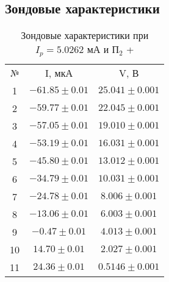 \documentclass[a4paper]{article}
\begin{document}
\subsection{Зондовые характеристики}
       \begin{table}[h]
    \centering
        \begin{tabular}{|c|c|c|}
        \cline{1-3}
        № & I, мкА& V, В\\ \cline{1-3}
        1 & $-61.85\pm 0.01$& $25.041 \pm 0.001$\\ \cline{1-3}
        2 & $-59.77\pm 0.01$& $22.045 \pm 0.001$\\ \cline{1-3}
        3 & $-57.05\pm 0.01$& $19.010 \pm 0.001$\\ \cline{1-3}
        4 & $-53.19\pm 0.01$& $16.031 \pm 0.001$\\ \cline{1-3}
        5 & $-45.80\pm 0.01$& $13.012 \pm 0.001$\\ \cline{1-3}
        6 & $-34.79\pm 0.01$& $10.031 \pm 0.001$\\ \cline{1-3}
        7 & $-24.78\pm 0.01$& $8.006 \pm 0.001$\\ \cline{1-3}
        8 & $-13.06\pm 0.01$& $6.003 \pm 0.001$\\ \cline{1-3}
        9 & $-0.47\pm 0.01$& $4.013 \pm 0.001$\\ \cline{1-3}
        10 & $14.70\pm 0.01$& $2.027 \pm 0.001$\\ \cline{1-3}
        11 & $24.36\pm 0.01$& $0.5146 \pm 0.001$\\ \cline{1-3}
        \end{tabular}
        \caption{Зондовые характеристики при $I_p = 5.0262$ мА и $\text{П}_2$ +}
        \label{tab:my_label}
    \end{table}
\end{document}
